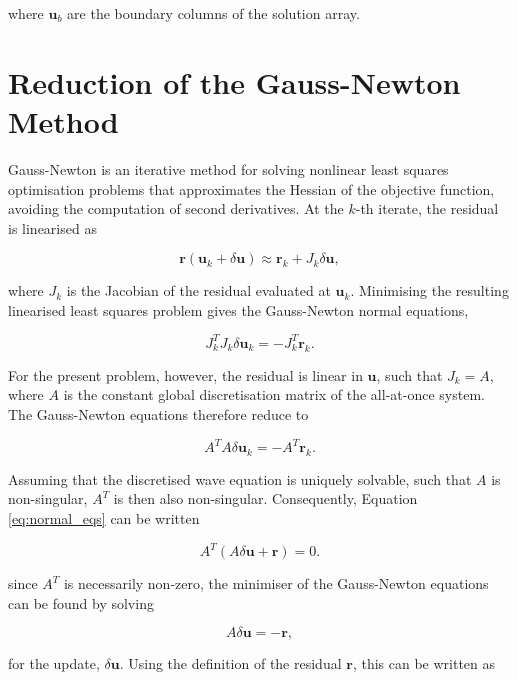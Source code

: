\documentclass[final-report]{report-template}
\begin{document}
where $\mathbf{u}_b$ are the boundary columns of the solution array.

\section{Reduction of the Gauss-Newton Method}
\label{app:gn}
Gauss-Newton is an iterative method for solving nonlinear least squares optimisation problems that approximates the Hessian of the objective function, avoiding the computation of second derivatives. At the $k$-th iterate, the residual is linearised as 

\begin{equation}
    \mathbf{r}(\mathbf{u}_k+\delta\mathbf{u}) \approx \mathbf{r}_k + J_k\delta\mathbf{u},
\end{equation}

where $J_k$ is the Jacobian of the residual evaluated at $\mathbf{u}_k$. Minimising the resulting linearised least squares problem gives the Gauss-Newton normal equations,

\begin{equation}
    J_k^T J_k \delta \mathbf{u}_k = - J_k^T \mathbf{r}_k.
    \label{eq:normal_eqs}
\end{equation}

For the present problem, however, the residual is linear in $\mathbf{u}$, such that $J_k = A$, where $A$ is the constant global discretisation matrix of the all-at-once system. The Gauss-Newton equations therefore reduce to

\begin{equation}
    A^T A\delta \mathbf{u}_k = - A^T \mathbf{r}_k.
\end{equation}

Assuming that the discretised wave equation is uniquely solvable, such that $A$ is non-singular, $A^T$ is then also non-singular. Consequently, Equation \eqref{eq:normal_eqs} can be written

\begin{equation}
    A^T(A\delta \mathbf{u} + \mathbf{r}) = 0.
\end{equation}

since $A^T$ is necessarily non-zero, the minimiser of the Gauss-Newton equations can be found by solving

\begin{equation}
    A\delta \mathbf{u} = - \mathbf{r},
\end{equation}

for the update, $\delta \mathbf{u}$. Using the definition of the residual $\mathbf{r}$, this can be written as
\end{document}
